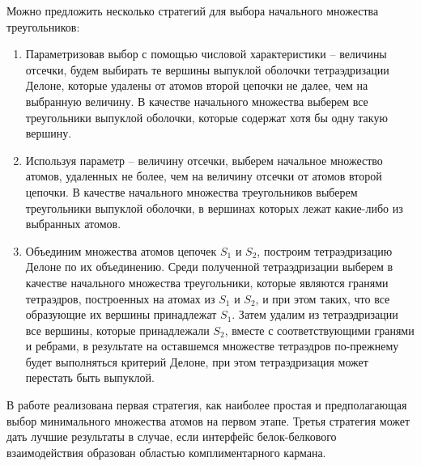 Можно предложить несколько стратегий для выбора начального множества треугольников:
\begin{enumerate}
\item Параметризовав выбор с помощью числовой характеристики -- величины отсечки, будем выбирать те вершины выпуклой оболочки тетраэдризации Делоне, которые удалены от атомов второй цепочки не далее, чем на выбранную величину. В качестве начального множества выберем все треугольники выпуклой оболочки, которые содержат хотя бы одну такую вершину.
\item Используя параметр -- величину отсечки, выберем начальное множество атомов, удаленных не более, чем на величину отсечки от атомов второй цепочки. В качестве начального множества треугольников выберем треугольники выпуклой оболочки, в вершинах которых лежат какие-либо из выбранных атомов.  
\item Объединим множества атомов цепочек $S_1$ и $S_2$, построим тетраэдризацию Делоне по их объединению. Среди полученной тетраэдризации выберем в качестве начального множества треугольники, которые являются гранями тетраэдров, построенных на атомах из $S_1$ и $S_2$, и при этом таких, что все образующие их вершины принадлежат $S_1$. Затем удалим из тетраэдризации все вершины, которые принадлежали $S_2$, вместе с соответствующими гранями и ребрами, в результате на оставшемся множестве тетраэдров по-прежнему будет выполняться критерий Делоне, при этом тетраэдризация может перестать быть выпуклой.
\end{enumerate} 

В работе реализована первая стратегия, как наиболее простая и предполагающая выбор минимального множества атомов на первом этапе. Третья стратегия может дать лучшие результаты в случае, если интерфейс белок-белкового взаимодействия образован областью комплиментарного кармана. 



